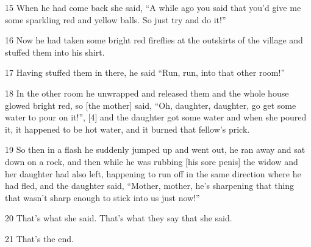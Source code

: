 {\LARGE{}15 When he had come back she said, ``A while ago you said that you'd give
me some sparkling red and yellow balls. So just try and do it!''}

{\LARGE{}16 Now he had taken some bright red fireflies at the outskirts of the
village and stuffed them into his shirt.}

{\LARGE{}17 Having stuffed them in there, he said ``Run, run, into that other room!''}

{\LARGE{}18 In the other room he unwrapped and released them and the whole house
glowed bright red, so [the mother] said, ``Oh, daughter, daughter, go get some
water to pour on it!'', [4] and the daughter got some water and when she poured
it, it happened to be hot water, and it burned that fellow's prick.}

{\LARGE{}19 So then in a flash he suddenly jumped up and went out, he ran away
and sat down on a rock, and then while he was rubbing [his sore penis] the widow
and her daughter had also left, happening to run off in the same direction where
he had fled, and the daughter said, ``Mother, mother, he's sharpening that thing
that wasn't sharp enough to stick into us just now!''}

{\LARGE{}20 That's what she said. That's what they say that she said.}

{\LARGE{}21 That's the end.}

